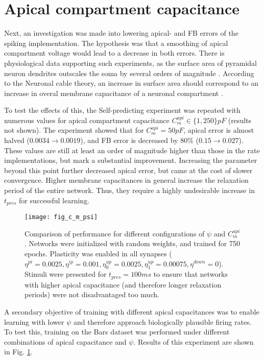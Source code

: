 \section{Apical compartment capacitance}\label{sec-c-m-api}

Next, an investigation was made into lowering apical- and FB errors of the spiking implementation. The hypothesis was
that a smoothing of apical compartment voltage would lead to a decrease in both errors. There is physiological data
supporting such experiments, as the surface area of pyramidal neuron dendrites outscales the soma by several orders of
magnitude \citep{Ishizuka1995}. According to the Neuronal cable theory, an increase in surface area should correspond to
an increase in overal membrane capacitance of a neuronal compartment \citep{Niebur2008}.


To test the effects of this, the Self-predicting experiment was repeated with numerous values for apical compartment
capacitance $C_m^{api} \in \{ 1, 250 \} pF$ (results not shown). The experiment showed that for $C_m^{api} = 50pF$,
apical error is almost halved ($0.0034 \rightarrow 0.0019$), and FB error is decreased by $80\%$ ($0.15 \rightarrow
0.027$). These values are still at least an order of magnitude higher than those in the rate implementations, but mark a
substantial improvement. Increasing the parameter beyond this point further decreased apical error, but came at the cost
of slower convergence. Higher membrane capacitances in general increase the relaxation period of the entire network.
Thus, they require a highly undesirable increase in $t_{pres}$ for successful learning.

\begin{figure}[h]
    \centering
    \texttt{[image: fig\_c\_m\_psi]}
    \caption[Comparison of performance for different configurations of $\psi$ and $C_m^{api}$.]{Comparison of
    performance for different  configurations of $\psi$ and $C_m^{api}$. Networks were initialized with random weights,
    and trained for 750 epochs. Plasticity was enabled in all synapses ($\eta^{pi}=0.0025, \eta^{ip}=0.001,
    \eta^{up}_0=0.0025, \eta^{up}_1=0.00075, \eta^{down}=0$). Stimuli were presented for $t_{pres}=100ms$ to ensure that
    networks with higher apical capacitance (and therefore longer relaxation periods) were not disadvantaged too much. }
    \label{fig-c-m-psi}
\end{figure}

A secondary objective of training with different apical capacitances was to enable learning with lower $\psi$ and
therefore approach biologically plausible firing rates. To test this, training on the Bars dataset was performed under
different combinations of apical capacitance and $\psi$. Results of this experiment are shown in Fig. \ref{fig-c-m-psi}.

